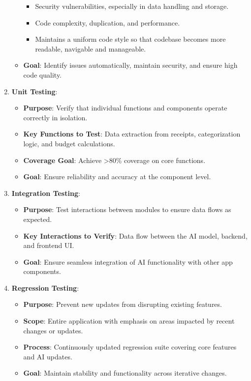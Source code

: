 \documentclass[12pt, titlepage]{article}
\begin{document}
\begin{enumerate}
\begin{itemize}
\begin{itemize}
			\item Security vulnerabilities, especially in data handling and storage.
			\item Code complexity, duplication, and performance.
			\item Maintains a uniform code style so that codebase becomes more readable, navigable and manageable.
		\end{itemize}
		\item \textbf{Goal}: Identify issues automatically, maintain security, and ensure high code quality.
	\end{itemize}
	\item \textbf{Unit Testing}:
	\begin{itemize}
		\item \textbf{Purpose}: Verify that individual functions and components operate correctly in isolation.
		\item \textbf{Key Functions to Test}: Data extraction from receipts, categorization logic, and budget calculations.
		\item \textbf{Coverage Goal}: Achieve >80\% coverage on core functions.
		\item \textbf{Goal}: Ensure reliability and accuracy at the component level.
	\end{itemize}
	\item \textbf{Integration Testing}:
	\begin{itemize}
		\item \textbf{Purpose}: Test interactions between modules to ensure data flows as expected.
		\item \textbf{Key Interactions to Verify}: Data flow between the AI model, backend, and frontend UI.
		\item \textbf{Goal}: Ensure seamless integration of AI functionality with other app components.
	\end{itemize}
	\item \textbf{Regression Testing}:
	\begin{itemize}
		\item \textbf{Purpose}: Prevent new updates from disrupting existing features.
		\item \textbf{Scope}: Entire application with emphasis on areas impacted by recent changes or updates.
		\item \textbf{Process}: Continuously updated regression suite covering core features and AI updates.
		\item \textbf{Goal}: Maintain stability and functionality across iterative changes.
	\end{itemize}
\end{enumerate}
\end{document}
